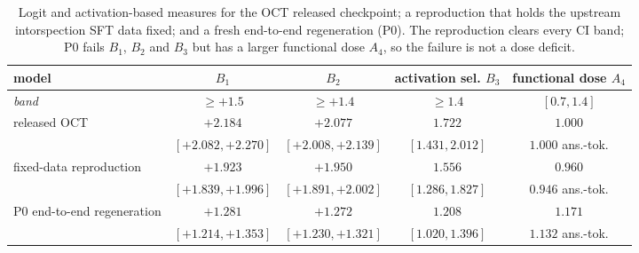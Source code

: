 \begin{table}[!htbp]
\centering
\small
\begin{tabular}{lcccc}
\toprule
model & $B_1$ & $B_2$ & activation sel. $B_3$ & functional dose $A_4$ \\
\midrule
\emph{band} & $\geq +1.5$ & $\geq +1.4$ & $\geq 1.4$ & $[0.7, 1.4]$ \\
\midrule
released OCT & $+2.184$ & $+2.077$ & $1.722$ & $1.000$ \\
 & {\scriptsize $[+2.082, +2.270]$} & {\scriptsize $[+2.008, +2.139]$} & {\scriptsize $[1.431, 2.012]$} & {\scriptsize $1.000$ ans.-tok.} \\
\addlinespace
fixed-data reproduction & $+1.923$ & $+1.950$ & $1.556$ & $0.960$ \\
 & {\scriptsize $[+1.839, +1.996]$} & {\scriptsize $[+1.891, +2.002]$} & {\scriptsize $[1.286, 1.827]$} & {\scriptsize $0.946$ ans.-tok.} \\
\addlinespace
P0 end-to-end regeneration & $+1.281$ & $+1.272$ & $1.208$ & $1.171$ \\
 & {\scriptsize $[+1.214, +1.353]$} & {\scriptsize $[+1.230, +1.321]$} & {\scriptsize $[1.020, 1.396]$} & {\scriptsize $1.132$ ans.-tok.} \\
\bottomrule
\end{tabular}
\caption{Logit and activation-based measures for the OCT released checkpoint; a reproduction that holds the upstream intorspection SFT data fixed; and a fresh end-to-end regeneration (P0). The reproduction clears every CI band; P0 fails $B_1$, $B_2$ and $B_3$ but has a larger functional dose $A_4$, so the failure is not a dose deficit.}
\label{tab:paraphrase-headline}
\end{table}
